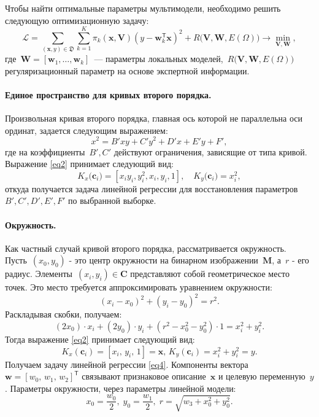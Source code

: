 Чтобы найти оптимальные параметры мультимодели, необходимо решить следующую оптимизационную задачу:
\[\label{9}
\mathcal{L} = \sum\limits_{(\mathbf{x}, y) \in \mathfrak{D}} \sum\limits_{k = 1}^{K} \pi_k(\mathbf{x}, \mathbf{V})(y - \mathbf{w}_k^{\mathsf{T}}\mathbf{x})^2 + R\bigl(\mathbf{V}, \mathbf{W}, E(\Omega)\bigr) \rightarrow \min_{\mathbf{V}, \mathbf{W}},
\]
где~$\mathbf{W} = [\mathbf{w}_1, \dots, \mathbf{w}_k]$~--- параметры локальных моделей,~$R\bigl(\mathbf{V}, \mathbf{W}, E(\Omega)\bigr)$ регуляризационный параметр на основе экспертной информации.

\paragraph{Единое пространство для кривых второго порядка.} Произвольная кривая второго порядка, главная ось которой не параллельна оси ординат, задается следующим выражением:
\[
\label{st:coef}
x^2 = B'xy+C'y^2+D'x+E'y+F',
\]
где на коэффициенты~$B', C'$ действуют ограничения, зависящие от типа кривой. Выражение \eqref{eq2} принимает следующий вид:
\[
\label{st:K_map}
K_x\bigr(\mathbf{c}_i\bigr)=\left[x_iy_i, y_i^2, x_i, y_i, 1\right], \quad K_y\bigr(\mathbf{c}_i\bigr)=x_i^2,
\]
откуда получается задача линейной регрессии для восстановления параметров~$B', C', D', E', F'$ по выбранной выборке.

\paragraph{Окружность.} Как частный случай кривой второго порядка, рассматривается окружность.
Пусть~$(x_0, y_0)$ - это центр окружности на бинарном изображении~$\mathbf{M}$, а~$r$ - его радиус.
Элементы~$(x_i, y_i)\in\mathbf{C}$ представляют собой геометрическое место точек. Это место требуется аппроксимировать уравнением окружности:
\[
(x_i - x_0)^2 + (y_i - y_0)^2 = r^2.
\]
Раскладывая скобки, получаем:
\[(2x_0)\cdot x_i + (2y_0)\cdot y_i + (r^2 - x_0^2 - y_0^2)\cdot 1 = x_i^2 + y_i^2 . 
\]
Тогда выражение \eqref{eq2} принимает следующий вид:
\[
\label{10}
K_{x}(\mathbf{c}_i) = [x_i, \, y_i, \, 1] = \mathbf{x}, \,  K_{y}(\mathbf{c}_i) = x_i^2+y_i^2 = y.
\] 
Получаем задачу линейной регрессии \eqref{eq4}.
Компоненты вектора~$\mathbf{w} = [w_0, \, w_1, \, w_2]^\mathsf{T}$ связывают признаковое описание~$\mathbf{x}$ и целевую переменную~$y$. Параметры окружности, через параметры линейной модели: \[ x_0 = \frac{w_0}{2}, \; y_0 = \frac{w_1}{2}, \; r = \sqrt{w_3 + x_0^2 + y_0 ^2}.\]

